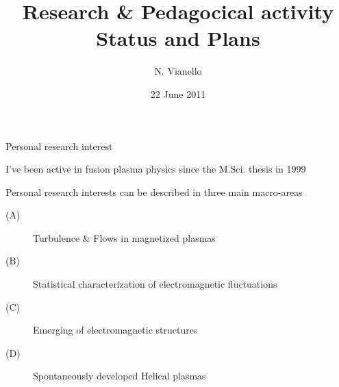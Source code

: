\documentclass[t,10pt]{beamer}
\title{Research \& Pedagocical activity \\
{\small Status and Plans}}
\author{N. Vianello }
\date{22 June 2011}
\begin{document}
\begin{titleframe}
\end{titleframe}

\begin{frame}{Personal research interest}
\begin{itemize}
{\large\item I've been active in fusion plasma physics since the
M.Sci. thesis in 1999
\item Personal research interests can be described in three main
  macro-areas
\begin{description}
\item[(A)] \textcolor{taorange}{Turbulence \& Flows in magnetized plasmas}
\item[(B)] \textcolor{ta3skyblue}{Statistical characterization of
    electromagnetic fluctuations}
\item[(C)]\textcolor{ta3chameleon}{Emerging of electromagnetic structures}
\item[(D)] \textcolor{tascarletred}{Spontaneously developed Helical plasmas}
\end{description}
}\end{itemize}
\end{frame}
\end{document}
